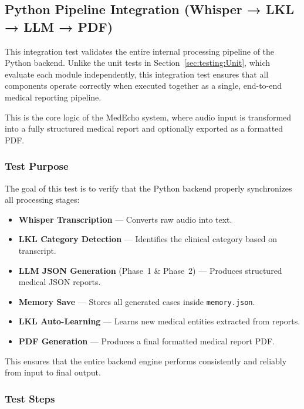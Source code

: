 
\subsection{Python Pipeline Integration (Whisper → LKL → LLM → PDF)}
\label{sec:testing:python-pipeline}

This integration test validates the entire internal processing pipeline of the Python backend.  
Unlike the unit tests in Section~\ref{sec:testing:Unit}, which evaluate each module independently,  
this integration test ensures that all components operate correctly when executed together as a  
single, end-to-end medical reporting pipeline.

This is the core logic of the MedEcho system, where audio input is transformed into a fully  
structured medical report and optionally exported as a formatted PDF.

\subsubsection*{Test Purpose}
The goal of this test is to verify that the Python backend properly synchronizes all processing stages:

\begin{itemize}
    \item \textbf{Whisper Transcription} --- Converts raw audio into text.
    \item \textbf{LKL Category Detection} --- Identifies the clinical category based on transcript.
    \item \textbf{LLM JSON Generation} (Phase~1 \& Phase~2) --- Produces structured medical JSON reports.
    \item \textbf{Memory Save} --- Stores all generated cases inside \texttt{memory.json}.
    \item \textbf{LKL Auto-Learning} --- Learns new medical entities extracted from reports.
    \item \textbf{PDF Generation} --- Produces a final formatted medical report PDF.
\end{itemize}

This ensures that the entire backend engine performs consistently and reliably from input to final output.

\subsubsection*{Test Steps}

